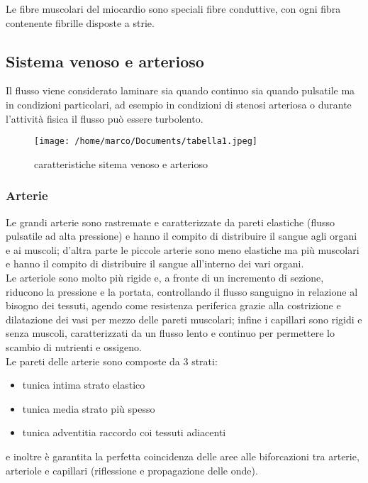 \documentclass[10pt]{article}
\begin{document}
Le fibre muscolari del miocardio sono speciali fibre conduttive, con ogni fibra contenente fibrille disposte a strie.

\subsection{Sistema venoso e arterioso}

Il flusso viene considerato laminare sia quando continuo sia quando pulsatile ma in condizioni particolari, ad esempio in condizioni di stenosi arteriosa o durante l'attività fisica il flusso può essere turbolento.

\begin{figure}[h!]
\centering
\texttt{[image: /home/marco/Documents/tabella1.jpeg]}
\caption{caratteristiche sitema venoso e arterioso}
\label{fig:tabella1}
\end{figure}

\subsubsection{Arterie}
Le grandi arterie sono rastremate e caratterizzate da pareti elastiche (flusso pulsatile ad alta pressione) e hanno il compito di distribuire il sangue agli organi e ai muscoli; d'altra parte le piccole arterie sono meno elastiche ma più muscolari e hanno il compito di distribuire il sangue all'interno dei vari organi.\\ Le arteriole sono molto più rigide e, a fronte di un incremento di sezione, riducono la pressione e la portata, controllando il flusso sanguigno in relazione al bisogno dei tessuti, agendo come resistenza periferica grazie alla costrizione e dilatazione dei vasi per mezzo delle pareti muscolari; infine i capillari sono rigidi e senza muscoli, caratterizzati da un flusso lento e continuo per permettere lo scambio di nutrienti e ossigeno. \\
Le pareti delle arterie sono composte da 3 strati:
\begin{itemize}
    \item tunica intima \textrightarrow strato elastico
    \item tunica media \textrightarrow strato più spesso
    \item tunica adventitia  \textrightarrow raccordo coi tessuti adiacenti
\end{itemize}
e inoltre è garantita la perfetta coincidenza delle aree alle biforcazioni tra arterie, arteriole e capillari (riflessione e propagazione delle onde).
\end{document}
